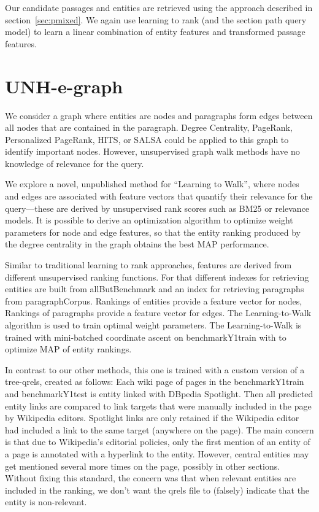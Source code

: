 \documentclass{article}
\begin{document}
Our candidate passages and entities are retrieved using the approach described in section~\ref{sec:pmixed}. We again use learning to rank (and the section path query model) to learn a linear combination of entity features and transformed passage features.



\section{UNH-e-graph}

We consider a graph where entities are nodes and paragraphs form edges between all nodes that are contained in the paragraph. Degree Centrality, PageRank, Personalized PageRank, HITS, or SALSA could be applied to this graph to identify important nodes. However, unsupervised graph walk methods have no knowledge of relevance for the query. 

We explore a novel, unpublished method for ``Learning to Walk'', where nodes and edges are associated with feature vectors that quantify their relevance for the query---these are derived by unsupervised rank scores such as BM25 or relevance models. It is possible to derive an optimization algorithm to optimize weight parameters for node and edge features, so that the entity ranking produced by the degree centrality in the graph obtains the best MAP performance.

Similar to traditional learning to rank approaches, features are derived from different unsupervised ranking functions. 
For that different indexes for retrieving entities  are built from allButBenchmark and an index for retrieving paragraphs from  paragraphCorpus. Rankings of entities provide a feature vector for nodes, Rankings of paragraphs provide a feature vector for edges.  The Learning-to-Walk algorithm is used to train optimal weight parameters. The Learning-to-Walk is trained with mini-batched coordinate ascent on benchmarkY1train with to optimize MAP of entity rankings.

In contrast to our other methods, this one is trained with a custom version of a tree-qrels, created as follows: Each wiki page of pages in the benchmarkY1train and benchmarkY1test is entity linked with DBpedia Spotlight. Then all predicted entity links are compared to link targets that were manually included in the page by Wikipedia editors. Spotlight links are only retained if the Wikipedia editor had included a link to the same target (anywhere on the page).  The main concern is that due to Wikipedia's editorial policies, only the first mention of an entity of a page is annotated with a hyperlink to the entity. However, central entities may get mentioned several more times on the page, possibly in other sections. Without fixing this standard, the concern was that when relevant entities are included in the ranking, we don't want the qrels file to (falsely) indicate that the entity is non-relevant.
\end{document}

